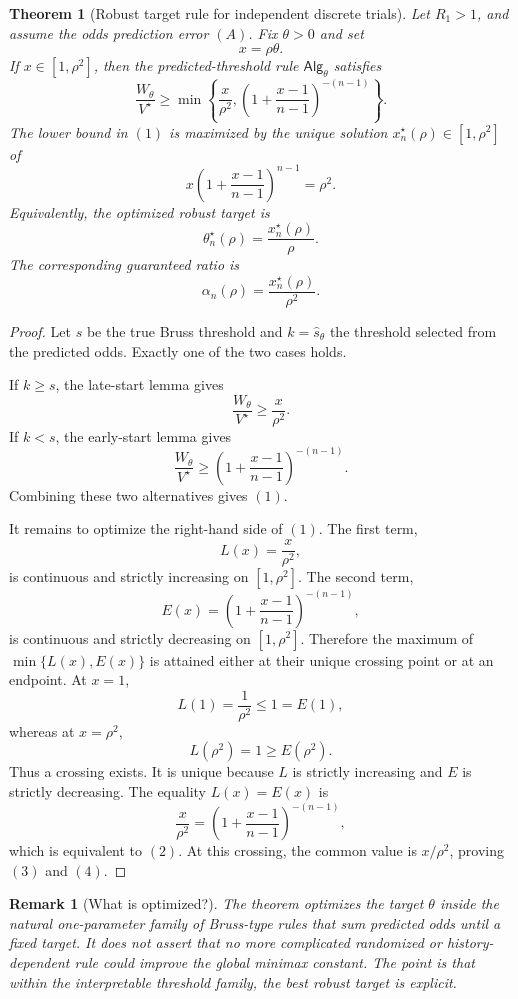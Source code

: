 \documentclass[11pt,a4paper]{article}
\newtheorem{theorem}{Theorem}
\newtheorem{remark}{Remark}
\newcommand{\alg}{\mathsf{Alg}}
\begin{document}
\begin{theorem}[Robust target rule for independent discrete trials]
\label{thm:discrete-robust}
Let \(R_1>1\), and assume the odds prediction error \((A)\).  Fix
\(\theta>0\) and set
\[
  x=\rho\theta.
\]
If \(x\in[1,\rho^2]\), then the predicted-threshold rule \(\alg_\theta\)
satisfies
\[
  \boxed{
  \frac{W_\theta}{V^\star}
  \ge
  \min\left\{
    \frac{x}{\rho^2},
    \left(1+\frac{x-1}{n-1}\right)^{-(n-1)}
  \right\}.
  }
  \tag{1}
\]
The lower bound in \((1)\) is maximized by the unique solution
\(x_n^\star(\rho)\in[1,\rho^2]\) of
\[
  \boxed{
  x\left(1+\frac{x-1}{n-1}\right)^{n-1}=\rho^2.
  }
  \tag{2}
\]
Equivalently, the optimized robust target is
\[
  \boxed{
  \theta_n^\star(\rho)=\frac{x_n^\star(\rho)}{\rho}.
  }
  \tag{3}
\]
The corresponding guaranteed ratio is
\[
  \boxed{
  \alpha_n(\rho)=\frac{x_n^\star(\rho)}{\rho^2}.
  }
  \tag{4}
\]
\end{theorem}

\begin{proof}
Let \(s\) be the true Bruss threshold and \(k=\hat s_\theta\) the threshold
selected from the predicted odds.  Exactly one of the two cases holds.

If \(k\ge s\), the late-start lemma gives
\[
  \frac{W_\theta}{V^\star}\ge\frac{x}{\rho^2}.
\]
If \(k<s\), the early-start lemma gives
\[
  \frac{W_\theta}{V^\star}
  \ge
  \left(1+\frac{x-1}{n-1}\right)^{-(n-1)}.
\]
Combining these two alternatives gives \((1)\).

It remains to optimize the right-hand side of \((1)\).  The first term,
\[
  L(x)=\frac{x}{\rho^2},
\]
is continuous and strictly increasing on \([1,\rho^2]\).  The second term,
\[
  E(x)=\left(1+\frac{x-1}{n-1}\right)^{-(n-1)},
\]
is continuous and strictly decreasing on \([1,\rho^2]\).  Therefore the maximum
of \(\min\{L(x),E(x)\}\) is attained either at their unique crossing point or at
an endpoint.  At \(x=1\),
\[
  L(1)=\frac1{\rho^2}\le1=E(1),
\]
whereas at \(x=\rho^2\),
\[
  L(\rho^2)=1\ge E(\rho^2).
\]
Thus a crossing exists.  It is unique because \(L\) is strictly increasing and
\(E\) is strictly decreasing.  The equality \(L(x)=E(x)\) is
\[
  \frac{x}{\rho^2}
  =
  \left(1+\frac{x-1}{n-1}\right)^{-(n-1)},
\]
which is equivalent to \((2)\).  At this crossing, the common value is
\(x/\rho^2\), proving \((3)\) and \((4)\).
\end{proof}

\begin{remark}[What is optimized?]
The theorem optimizes the target \(\theta\) inside the natural one-parameter
family of Bruss-type rules that sum predicted odds until a fixed target.  It
does not assert that no more complicated randomized or history-dependent rule
could improve the global minimax constant.  The point is that within the
interpretable threshold family, the best robust target is explicit.
\end{remark}
\end{document}
